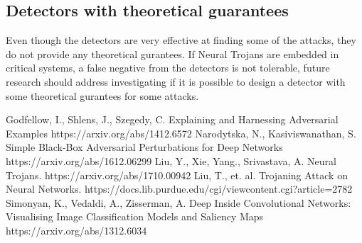 \documentclass[letterpaper, 10 pt, conference]{ieeeconf}  %
\begin{document}
\subsection{Detectors with theoretical guarantees}

Even though the detectors are very effective at finding some of the attacks,
they do not provide any theoretical gurantees. If Neural Trojans are embedded
in critical systems, a false negative from the detectors is not tolerable,
future research should address investigating if it is possible to design a
detector with some theoretical gurantees for some attacks.


\begin{thebibliography}{99}
 Godfellow, I., Shlens, J., Szegedy, C. Explaining and Harnessing Adversarial Examples https://arxiv.org/abs/1412.6572
 Narodytska, N., Kasiviswanathan, S. Simple Black-Box Adversarial Perturbations for Deep Networks https://arxiv.org/abs/1612.06299
 Liu, Y., Xie, Yang., Srivastava, A. Neural Trojans. https://arxiv.org/abs/1710.00942
 Liu, T., et. al. Trojaning Attack on Neural Networks. https://docs.lib.purdue.edu/cgi/viewcontent.cgi?article=2782 
 Simonyan, K., Vedaldi, A., Zisserman, A. Deep Inside Convolutional Networks: Visualising Image Classification Models and Saliency Maps https://arxiv.org/abs/1312.6034
\end{thebibliography}
\end{document}
